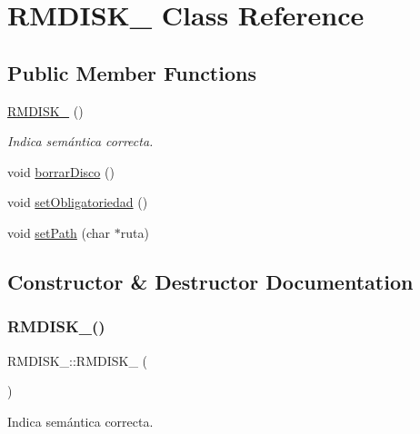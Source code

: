 \hypertarget{classRMDISK__}{}\section{R\+M\+D\+I\+S\+K\+\_\+ Class Reference}
\label{classRMDISK__}
\subsection*{Public Member Functions}
\begin{DoxyCompactItemize}
\item 
\hyperlink{classRMDISK___ad4e0a6a86ffc42b52cd98d039e035020}{R\+M\+D\+I\+S\+K\+\_\+} ()
\begin{DoxyCompactList}\small\item\em Indica semántica correcta. \end{DoxyCompactList}\item 
void \hyperlink{classRMDISK___a49d4ed7ede3b344f5be86dd411314d34}{borrar\+Disco} ()
\item 
void \hyperlink{classRMDISK___afe9e2e1e4ab06f37188e78fa5ce2e83b}{set\+Obligatoriedad} ()
\item 
void \hyperlink{classRMDISK___a0aca679d77aa2cef1a72568693814eb8}{set\+Path} (char $\ast$ruta)
\end{DoxyCompactItemize}


\subsection{Constructor \& Destructor Documentation}
\mbox{\label{classRMDISK___ad4e0a6a86ffc42b52cd98d039e035020}} 
\subsubsection{\texorpdfstring{R\+M\+D\+I\+S\+K\+\_\+()}{RMDISK\_()}}
{\footnotesize\ttfamily R\+M\+D\+I\+S\+K\+\_\+\+::\+R\+M\+D\+I\+S\+K\+\_\+ (\begin{DoxyParamCaption}{ }\end{DoxyParamCaption})\hspace{0.3cm}{\ttfamily [inline]}}



Indica semántica correcta. 

